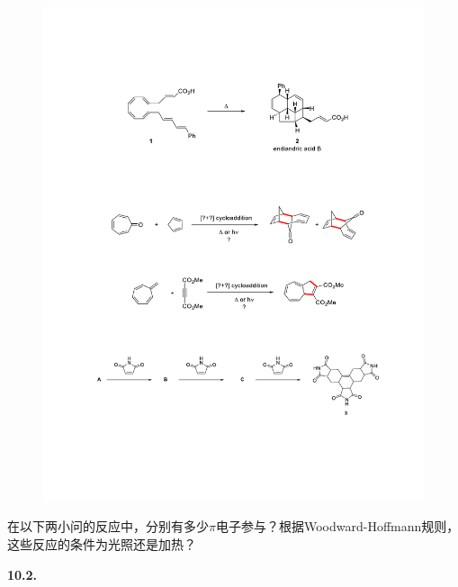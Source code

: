 \begin{figure}[h]
	\centering
	\includegraphics[width=12cm]{./pic/t10-2.pdf}
\end{figure}

在以下两小问的反应中，分别有多少$\pi$电子参与？根据Woodward-Hoffmann规则，这些反应的条件为光照还是加热？

\noindent\textbf{10.2.}

